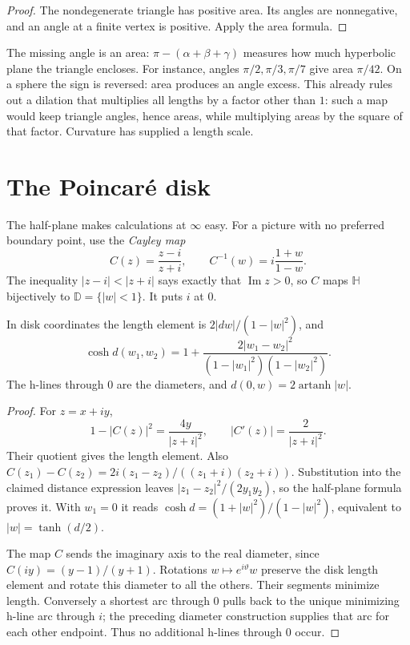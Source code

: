 \begin{proof}
The nondegenerate triangle has positive area. Its angles are nonnegative, and an angle at a finite vertex is positive. Apply the area formula.
\end{proof}

The missing angle is an area: $\pi-(\alpha+\beta+\gamma)$ measures how much hyperbolic plane the triangle encloses. For instance, angles $\pi/2,\pi/3,\pi/7$ give area $\pi/42$. On a sphere the sign is reversed: area produces an angle excess. This already rules out a dilation that multiplies all lengths by a factor other than $1$: such a map would keep triangle angles, hence areas, while multiplying areas by the square of that factor. Curvature has supplied a length scale.

\section{The Poincar\'e disk}

The half-plane makes calculations at $\infty$ easy. For a picture with no preferred boundary point, use the \emph{Cayley map}
\[
C(z)=\frac{z-i}{z+i},\qquad C^{-1}(w)=i\frac{1+w}{1-w}.
\]
The inequality $|z-i|<|z+i|$ says exactly that $\operatorname{Im}z>0$, so $C$ maps $\mathbb H$ bijectively to $\mathbb D=\{|w|<1\}$. It puts $i$ at $0$.

\begin{proposition}\label{geometry:prop:disk}
In disk coordinates the length element is $2|dw|/(1-|w|^2)$, and
\[
\cosh d(w_1,w_2)=1+\frac{2|w_1-w_2|^2}{(1-|w_1|^2)(1-|w_2|^2)}.
\]
The h-lines through $0$ are the diameters, and $d(0,w)=2\operatorname{artanh}|w|$.
\end{proposition}

\begin{proof}
For $z=x+iy$,
\[
1-|C(z)|^2=\frac{4y}{|z+i|^2},\qquad |C'(z)|=\frac2{|z+i|^2}.
\]
Their quotient gives the length element. Also
$C(z_1)-C(z_2)=2i(z_1-z_2)/((z_1+i)(z_2+i))$. Substitution into the claimed distance expression leaves $|z_1-z_2|^2/(2y_1y_2)$, so the half-plane formula proves it. With $w_1=0$ it reads $\cosh d=(1+|w|^2)/(1-|w|^2)$, equivalent to $|w|=\tanh(d/2)$.

The map $C$ sends the imaginary axis to the real diameter, since $C(iy)=(y-1)/(y+1)$. Rotations $w\mapsto e^{i\vartheta}w$ preserve the disk length element and rotate this diameter to all the others. Their segments minimize length. Conversely a shortest arc through $0$ pulls back to the unique minimizing h-line arc through $i$; the preceding diameter construction supplies that arc for each other endpoint. Thus no additional h-lines through $0$ occur.
\end{proof}

